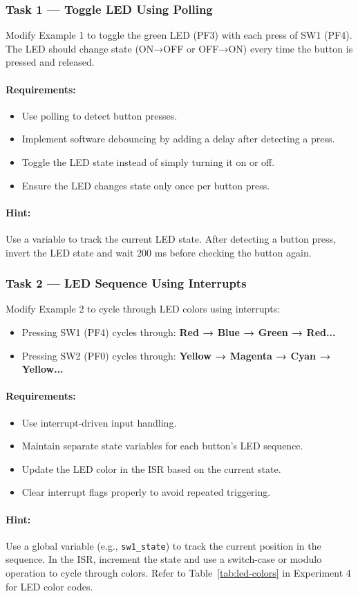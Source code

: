 \subsubsection{Task 1 — Toggle LED Using Polling}

Modify Example 1 to toggle the green LED (PF3) with each press of SW1 (PF4). The LED should change state (ON→OFF or OFF→ON) every time the button is pressed and released.

\paragraph{Requirements:}
\begin{itemize}[nosep]
  \item Use polling to detect button presses.
  \item Implement software debouncing by adding a delay after detecting a press.
  \item Toggle the LED state instead of simply turning it on or off.
  \item Ensure the LED changes state only once per button press.
\end{itemize}

\paragraph{Hint:}
Use a variable to track the current LED state. After detecting a button press, invert the LED state and wait 200 ms before checking the button again.

\subsubsection{Task 2 — LED Sequence Using Interrupts}

Modify Example 2 to cycle through LED colors using interrupts:
\begin{itemize}[nosep]
  \item Pressing SW1 (PF4) cycles through: \textbf{Red → Blue → Green → Red...}
  \item Pressing SW2 (PF0) cycles through: \textbf{Yellow → Magenta → Cyan → Yellow...}
\end{itemize}

\paragraph{Requirements:}
\begin{itemize}[nosep]
  \item Use interrupt-driven input handling.
  \item Maintain separate state variables for each button's LED sequence.
  \item Update the LED color in the ISR based on the current state.
  \item Clear interrupt flags properly to avoid repeated triggering.
\end{itemize}

\paragraph{Hint:}
Use a global variable (e.g., \texttt{sw1\_state}) to track the current position in the sequence. In the ISR, increment the state and use a switch-case or modulo operation to cycle through colors. Refer to Table~\ref{tab:led-colors} in Experiment 4 for LED color codes.